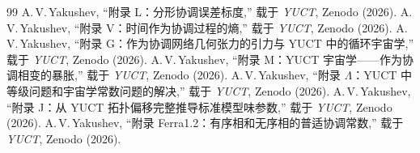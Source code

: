 \documentclass[11pt,a4paper]{article}
\theoremstyle{remark}
\begin{document}
	\begin{thebibliography}{99}
		 A.\,V.\,Yakushev, “附录 L：分形协调误差标度,” 载于 \emph{YUCT}, Zenodo (2026).
		 A.\,V.\,Yakushev, “附录 V：时间作为协调过程的熵,” 载于 \emph{YUCT}, Zenodo (2026).
		 A.\,V.\,Yakushev, “附录 G：作为协调网络几何张力的引力与 YUCT 中的循环宇宙学,” 载于 \emph{YUCT}, Zenodo (2026).
		 A.\,V.\,Yakushev, “附录 M：YUCT 宇宙学——作为协调相变的暴胀,” 载于 \emph{YUCT}, Zenodo (2026).
		 A.\,V.\,Yakushev, “附录 \(\Lambda\)：YUCT 中等级问题和宇宙学常数问题的解决,” 载于 \emph{YUCT}, Zenodo (2026).
		 A.\,V.\,Yakushev, “附录 J：从 YUCT 拓扑偏移完整推导标准模型味参数,” 载于 \emph{YUCT}, Zenodo (2026).
		 A.\,V.\,Yakushev, “附录 Ferra1.2：有序相和无序相的普适协调常数,” 载于 \emph{YUCT}, Zenodo (2026).
	\end{thebibliography}
	
\end{document}

